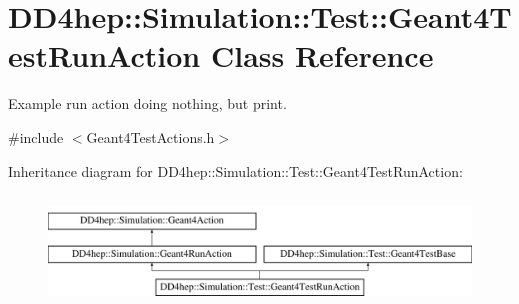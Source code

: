 \hypertarget{class_d_d4hep_1_1_simulation_1_1_test_1_1_geant4_test_run_action}{}\section{D\+D4hep\+:\+:Simulation\+:\+:Test\+:\+:Geant4\+Test\+Run\+Action Class Reference}
\label{class_d_d4hep_1_1_simulation_1_1_test_1_1_geant4_test_run_action}


Example run action doing nothing, but print.  




{\ttfamily \#include $<$Geant4\+Test\+Actions.\+h$>$}

Inheritance diagram for D\+D4hep\+:\+:Simulation\+:\+:Test\+:\+:Geant4\+Test\+Run\+Action\+:\begin{figure}[H]
\begin{center}
\leavevmode
\includegraphics[height=2.947368cm]{class_d_d4hep_1_1_simulation_1_1_test_1_1_geant4_test_run_action}
\end{center}
\end{figure}
